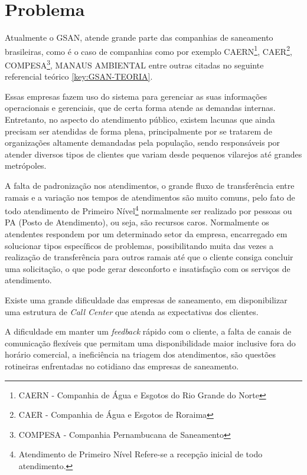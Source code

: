 \section*{Problema}

Atualmente o GSAN, atende grande parte das companhias de saneamento brasileiras, como é o caso de companhias como por exemplo CAERN\footnote{CAERN - Companhia de Água e Esgotos do Rio Grande do Norte}, CAER\footnote{CAER - Companhia de Água e Esgotos de Roraima}, COMPESA\footnote{COMPESA - Companhia Pernambucana de Saneamento}, MANAUS AMBIENTAL entre outras citadas no seguinte referencial teórico \ref{key:GSAN-TEORIA}.

Essas empresas fazem uso do sistema para gerenciar as suas informações operacionais e gerenciais, que de certa forma atende as demandas internas. Entretanto, no aspecto do atendimento público, existem lacunas que ainda precisam ser atendidas de forma plena, principalmente por se tratarem de organizações altamente demandadas pela população, sendo responsáveis por atender diversos tipos de clientes que variam desde pequenos vilarejos até grandes metrópoles.

A falta de padronização nos atendimentos, o grande fluxo de transferência entre ramais e a variação nos tempos de atendimentos são muito comuns, pelo fato de todo atendimento de Primeiro Nível\footnote{Atendimento de Primeiro Nível Refere-se a recepção inicial de todo atendimento.} normalmente ser realizado por pessoas ou PA (Posto de Atendimento), ou seja, são recursos caros. Normalmente os atendentes respondem por um determinado setor da empresa, encarregado em solucionar tipos específicos de problemas, possibilitando muita das vezes a realização de transferência para outros ramais até que o cliente consiga concluir uma solicitação, o que pode gerar desconforto e insatisfação com os serviços de atendimento.
	
Existe uma grande dificuldade das empresas de saneamento, em disponibilizar uma estrutura de \textit{Call Center} que atenda as expectativas dos clientes.

A dificuldade em manter um \textit{feedback} rápido com o cliente, a falta de canais de comunicação flexíveis que permitam uma disponibilidade maior inclusive fora do horário comercial, a ineficiência na triagem dos atendimentos, são questões rotineiras enfrentadas no cotidiano das empresas de saneamento.
